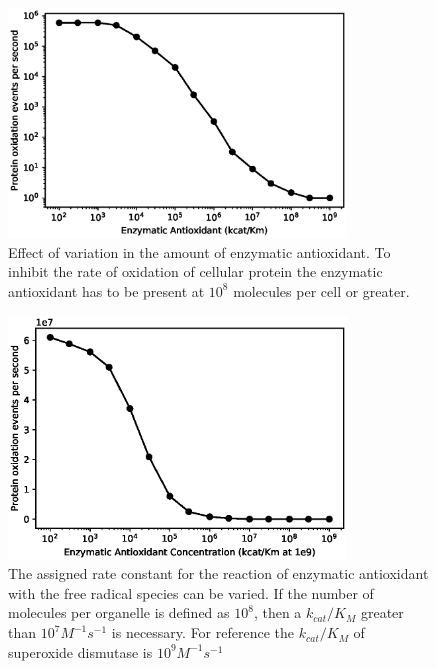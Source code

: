 \documentclass[preprint,12pt,authoryear]{elsarticle}
\begin{document}
\begin{figure}
\begin{center}
\includegraphics[width=0.8\textwidth]{Fig2A.eps}
\end{center}
\caption{\label{fig:g2a} 
Effect of variation in the amount of enzymatic antioxidant.
To inhibit the rate of oxidation of cellular protein the enzymatic antioxidant has to be present at 
$10^8$ molecules per cell or greater.
}
\end{figure}

\begin{figure}
\begin{center}
\includegraphics[width=0.8\textwidth]{Fig2B.eps}
\end{center}
\caption{\label{fig:g2b} The assigned rate constant for the reaction of enzymatic antioxidant with the free radical species can be varied. If the number of molecules per organelle is defined as $10^8$, then a $k_{cat}/K_M$ greater than  $10^7 M^{-1} s^{-1}$ is necessary. For reference the $k_{cat}/K_M$ of superoxide dismutase is $10^9 M^{-1} s^{-1}$}
\end{figure}
\end{document}
